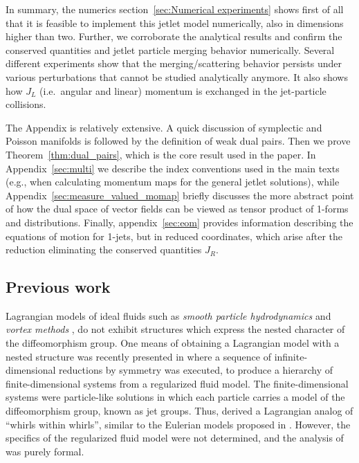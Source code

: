 \documentclass[12pt]{amsart}
\begin{document}
In summary, the numerics section~\ref{sec:Numerical experiments} shows first of all that it is feasible to implement this jetlet model numerically, also in dimensions higher than
two. Further, we corroborate the analytical results and confirm the
conserved quantities and jetlet particle merging behavior numerically.
Several different experiments show that the merging/scattering behavior persists
under various perturbations that cannot be studied analytically anymore.
It also shows how $J_L$ (i.e.\ angular and linear) momentum is exchanged
in the jet-particle collisions.



The Appendix is relatively extensive. A quick discussion of symplectic and Poisson manifolds is followed by the definition of weak dual pairs. Then we prove Theorem~\ref{thm:dual_pairs}, which is the core result used in the paper. In Appendix~\ref{sec:multi} we describe the index conventions used in the main texts (e.g., when calculating momentum maps for the general jetlet solutions), while Appendix~\ref{sec:measure_valued_momap} briefly discusses the more abstract point of how the dual space of vector fields can be viewed as tensor product of 1-forms and distributions.
Finally, appendix~\ref{sec:eom} provides information describing the equations of motion for 1-jets, but in reduced coordinates, which arise after the reduction eliminating the conserved quantities $J_R$.

\subsection{Previous work}
  Lagrangian models of ideal fluids such as \emph{smooth particle hydrodynamics} \cite{Monaghan1977,Lucy1977} and
\emph{vortex methods} \cite{Chorin1973}, do not exhibit structures which express the nested character of the diffeomorphism group.
 One means of obtaining a Lagrangian model with a nested structure
 was recently presented in \cite{JacobsRatiuDesbrun2013}
 where a sequence of infinite-dimensional reductions by symmetry was
 executed, to produce a hierarchy of finite-dimensional systems from a
 regularized fluid model.
 The finite-dimensional systems were particle-like solutions
 in which each particle carries a model of the diffeomorphism group,
 known as jet groups.
 Thus, \cite{JacobsRatiuDesbrun2013} derived a Lagrangian analog of 
 ``whirls within whirls'', similar to the Eulerian models proposed
 in \cite{HolmTronci2012}.
 However, the specifics of the regularized fluid model were not determined,
 and the analysis of \cite{JacobsRatiuDesbrun2013} was purely
 formal.
\end{document}
